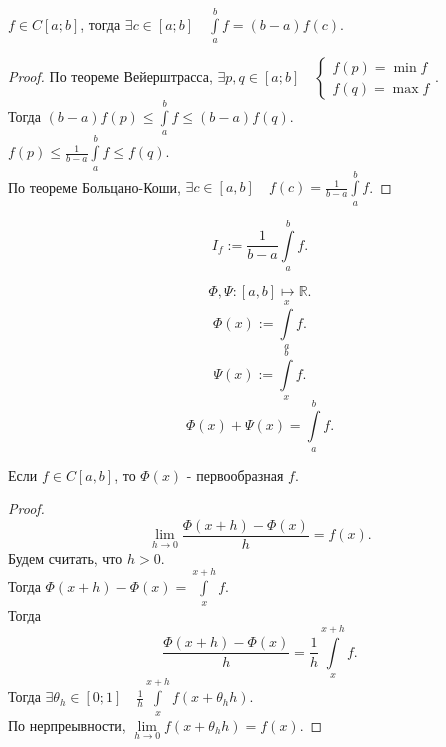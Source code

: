 \documentclass[11pt, oneside]{article}   	%
\begin{document}
       \begin{theorem}
           $f\in C\left[a; b\right]$, тогда $\exists{c\in \left[a; b\right]}\quad \int\limits_{a}^{b} f = (b-a)f(c) $.
           \begin{proof}
               По теореме Вейерштрасса, $\exists{p, q\in \left[a; b\right]}\quad \begin{cases}
                   f(p) = \min f\\
                   f(q) = \max f
               \end{cases}$.\\
               Тогда $(b-a)f(p) \le \int\limits_{a}^{b} f \le (b-a)f(q) $.\\
               $f(p) \le \frac{1}{b-a} \int\limits_{a}^{b} f \le f(q) $.\\
               По теореме Больцано-Коши, $\exists{c\in \left[a ,b\right]}\quad f(c) = \frac{1}{b-a}\int\limits_{a}^{b} f$.
           \end{proof}
       \end{theorem}
       \begin{definition}
       \[ I_f := \frac{1}{b-a} \int\limits_{a}^{b} f  .\]  
       \end{definition}
       \begin{definition}
           \[ \Phi, \Psi : \left[a, b\right] \mapsto \mathbb{R} .\] 
           \[ \Phi(x) := \int\limits_{a}^{x} f  .\]
           \[ \Psi(x) := \int\limits_{x}^{b} f  .\]
           \[ \Phi(x) + \Psi(x) = \int\limits_{a}^{b} f  .\] 
       \end{definition}
       \begin{theorem}
           Если $f\in C[a, b]$, то $\Phi(x)$ - первообразная $f$.
           \begin{proof}
               \[ \lim\limits_{h \to 0} \frac{\Phi(x+h) - \Phi(x)}{h} = f(x) .\]
               Будем считать, что $h>0$.\\
               Тогда $\Phi(x+h) - \Phi(x) = \int\limits_{x}^{x+h} f $.\\
               Тогда 
               \[ \frac{\Phi(x+h)-\Phi(x)}{h} = \frac{1}{h}\int\limits_{x}^{x+h} f  .\]
               Тогда $\exists{\theta_{h}\in \left[0; 1\right]}\quad \frac{1}{h}\int\limits_{x}^{x+h} f(x+\theta_h h) $.\\
               По нерпреывности, $\lim\limits_{h \to 0} f(x+\theta_{h} h) = f(x)$.
           \end{proof}
       \end{theorem}
\end{document}
